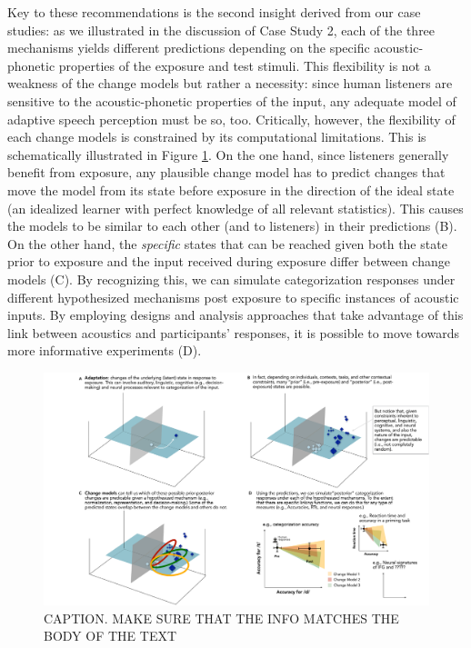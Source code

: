 \documentclass[
  11pt,
  english,
  man,floatsintext]{apa6}
\begin{document}
Key to these recommendations is the second insight derived from our case studies: as we illustrated in the discussion of Case Study 2, each of the three mechanisms yields different predictions depending on the specific acoustic-phonetic properties of the exposure and test stimuli. This flexibility is not a weakness of the change models but rather a necessity: since human listeners are sensitive to the acoustic-phonetic properties of the input, any adequate model of adaptive speech perception must be so, too. Critically, however, the flexibility of each change models is constrained by its computational limitations. This is schematically illustrated in Figure \ref{fig:underlying-states-and-measures}. On the one hand, since listeners generally benefit from exposure, any plausible change model has to predict changes that move the model from its state before exposure in the direction of the ideal state (an idealized learner with perfect knowledge of all relevant statistics). This causes the models to be similar to each other (and to listeners) in their predictions (B). On the other hand, the \emph{specific} states that can be reached given both the state prior to exposure and the input received during exposure differ between change models (C). By recognizing this, we can simulate categorization responses under different hypothesized mechanisms post exposure to specific instances of acoustic inputs. By employing designs and analysis approaches that take advantage of this link between acoustics and participants' responses, it is possible to move towards more informative experiments (D).

\begin{figure}[h]
\begin{center}
\includegraphics[width=1 \columnwidth]{../figures/diagrams/underlying-states-and-measures.png}
\caption{CAPTION. MAKE SURE THAT THE INFO MATCHES THE BODY OF THE TEXT}\label{fig:underlying-states-and-measures}
\end{center}
\end{figure}
\end{document}
